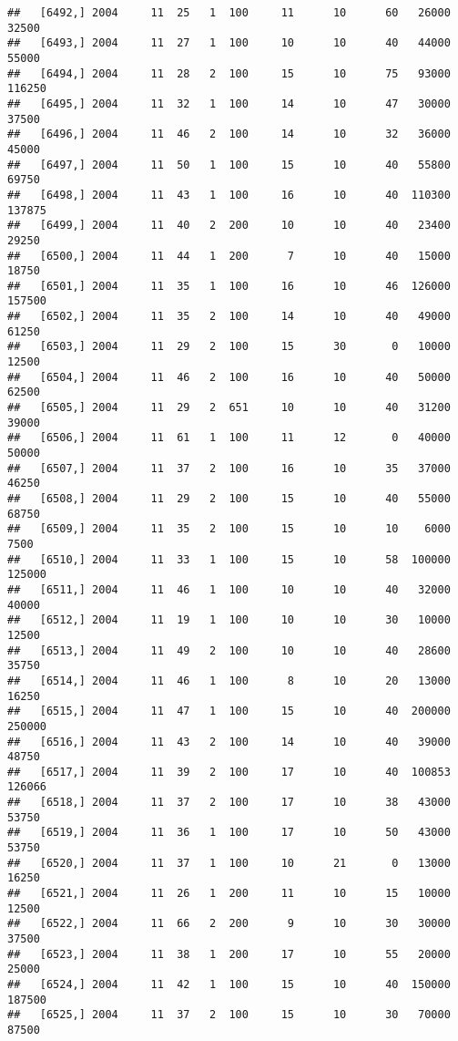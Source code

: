 \documentclass{article}\usepackage[]{graphicx}\usepackage[]{color}
\makeatletter
\newenvironment{kframe}{%
 \def\at@end@of@kframe{}%
 \ifinner\ifhmode%
  \def\at@end@of@kframe{\end{minipage}}%
  \begin{minipage}{\columnwidth}%
 \fi\fi%
 \def\FrameCommand##1{\hskip\@totalleftmargin \hskip-\fboxsep
 \colorbox{shadecolor}{##1}\hskip-\fboxsep
     \hskip-\linewidth \hskip-\@totalleftmargin \hskip\columnwidth}%
 \MakeFramed {\advance\hsize-\width
   \@totalleftmargin\z@ \linewidth\hsize
   \@setminipage}}%
 {\par\unskip\endMakeFramed%
 \at@end@of@kframe}
\newenvironment{knitrout}{}{} %
\makeatother
\begin{document}
\begin{knitrout}
\begin{kframe}
\begin{verbatim}
##   [6492,] 2004     11  25   1  100     11      10      60   26000   32500
##   [6493,] 2004     11  27   1  100     10      10      40   44000   55000
##   [6494,] 2004     11  28   2  100     15      10      75   93000  116250
##   [6495,] 2004     11  32   1  100     14      10      47   30000   37500
##   [6496,] 2004     11  46   2  100     14      10      32   36000   45000
##   [6497,] 2004     11  50   1  100     15      10      40   55800   69750
##   [6498,] 2004     11  43   1  100     16      10      40  110300  137875
##   [6499,] 2004     11  40   2  200     10      10      40   23400   29250
##   [6500,] 2004     11  44   1  200      7      10      40   15000   18750
##   [6501,] 2004     11  35   1  100     16      10      46  126000  157500
##   [6502,] 2004     11  35   2  100     14      10      40   49000   61250
##   [6503,] 2004     11  29   2  100     15      30       0   10000   12500
##   [6504,] 2004     11  46   2  100     16      10      40   50000   62500
##   [6505,] 2004     11  29   2  651     10      10      40   31200   39000
##   [6506,] 2004     11  61   1  100     11      12       0   40000   50000
##   [6507,] 2004     11  37   2  100     16      10      35   37000   46250
##   [6508,] 2004     11  29   2  100     15      10      40   55000   68750
##   [6509,] 2004     11  35   2  100     15      10      10    6000    7500
##   [6510,] 2004     11  33   1  100     15      10      58  100000  125000
##   [6511,] 2004     11  46   1  100     10      10      40   32000   40000
##   [6512,] 2004     11  19   1  100     10      10      30   10000   12500
##   [6513,] 2004     11  49   2  100     10      10      40   28600   35750
##   [6514,] 2004     11  46   1  100      8      10      20   13000   16250
##   [6515,] 2004     11  47   1  100     15      10      40  200000  250000
##   [6516,] 2004     11  43   2  100     14      10      40   39000   48750
##   [6517,] 2004     11  39   2  100     17      10      40  100853  126066
##   [6518,] 2004     11  37   2  100     17      10      38   43000   53750
##   [6519,] 2004     11  36   1  100     17      10      50   43000   53750
##   [6520,] 2004     11  37   1  100     10      21       0   13000   16250
##   [6521,] 2004     11  26   1  200     11      10      15   10000   12500
##   [6522,] 2004     11  66   2  200      9      10      30   30000   37500
##   [6523,] 2004     11  38   1  200     17      10      55   20000   25000
##   [6524,] 2004     11  42   1  100     15      10      40  150000  187500
##   [6525,] 2004     11  37   2  100     15      10      30   70000   87500

\end{verbatim}
\end{kframe}
\end{knitrout}
\end{document}
